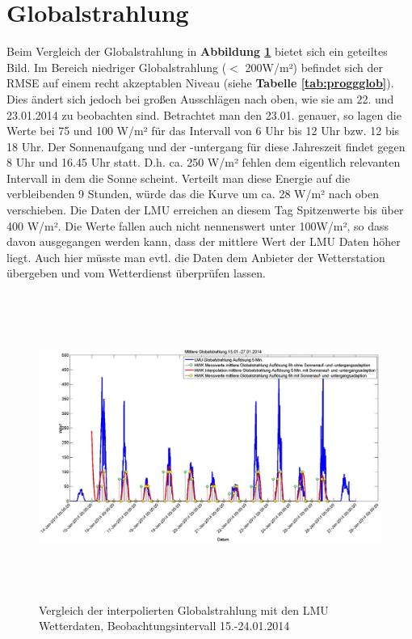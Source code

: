 \section{Globalstrahlung}
Beim Vergleich der Globalstrahlung in \textbf{Abbildung \ref{fig:globalstr}} bietet sich ein geteiltes Bild. Im Bereich niedriger Globalstrahlung ($<$ 200W/m²) befindet sich der RMSE auf einem recht akzeptablen Niveau (siehe \textbf{Tabelle \ref{tab:proggglob}}). Dies ändert sich jedoch bei großen Ausschlägen nach oben, wie sie am 22. und 23.01.2014 zu beobachten sind. Betrachtet man den 23.01. genauer, so lagen die Werte bei 75 und 100 W/m² für das Intervall von 6 Uhr bis 12 Uhr bzw. 12 bis 18 Uhr. Der Sonnenaufgang und der -untergang für diese Jahreszeit findet gegen 8 Uhr und 16.45 Uhr statt. D.h. ca. 250 W/m² fehlen dem eigentlich relevanten Intervall in dem die Sonne scheint. Verteilt man diese Energie auf die verbleibenden 9 Stunden, würde das die Kurve um ca. 28 W/m² nach oben verschieben. Die Daten der LMU erreichen an diesem Tag Spitzenwerte bis über 400 W/m². Die Werte fallen auch nicht nennenswert unter 100W/m², so dass davon ausgegangen werden kann, dass der mittlere Wert der LMU Daten höher liegt. Auch hier müsste man evtl. die Daten dem Anbieter der Wetterstation übergeben und vom Wetterdienst überprüfen lassen.   
\begin{figure}[htbp]
\centering
\includegraphics[width=16cm,height=10cm]{analyse/globalstr2}
\caption{Vergleich der interpolierten Globalstrahlung mit den LMU Wetterdaten, Beobachtungsintervall 15.-24.01.2014}
\label{fig:globalstr}
\end{figure}
